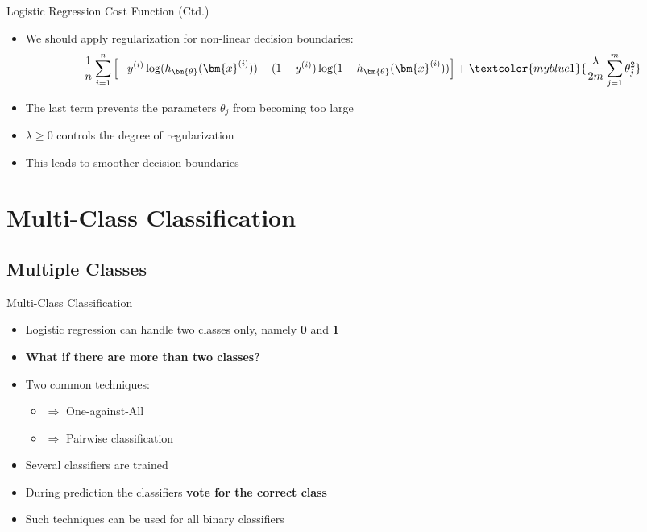 \begin{frame}{Logistic Regression Cost Function (Ctd.)}{}
	\begin{itemize}
		\item We should apply regularization for non-linear decision boundaries:
		\footnotesize
		\begin{equation}
			\frac{1}{n} \sum_{i=1}^n \left[
				-y^{(i)} \log(h_{\bm{\theta}}(\bm{x}^{(i)})) - (1 - y^{(i)}) \log(1 - h_{\bm{\theta}}(\bm{x}^{(i)}))
			\right] + \textcolor{myblue1}{\frac{\lambda}{2m} \sum_{j=1}^m \theta_j^2}
		\end{equation}
		\normalsize
		\item The last term prevents the parameters $\theta_j$ from becoming too large
		\item $\lambda \ge 0$ controls the degree of regularization
		\item This leads to smoother decision boundaries
	\end{itemize}
\end{frame}


\section{Multi-Class Classification}

\subsection{Multiple Classes}

\begin{frame}{Multi-Class Classification}{}
	\begin{itemize}
		\item Logistic regression can handle two classes only, namely \textbf{0} and \textbf{1}
		\item \textbf{What if there are more than two classes?}
		\item Two common techniques:
		\begin{itemize}
			\item {} 	$\Rightarrow$ One-against-All
			\item {} 	$\Rightarrow$ Pairwise classification
		\end{itemize}
		\item Several classifiers are trained
		\item During prediction the classifiers \textbf{vote for the correct class}
		\item Such techniques can be used for all binary classifiers
	\end{itemize}
\end{frame}


